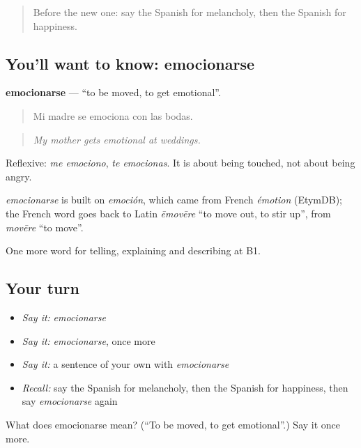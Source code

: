\begin{quote}
Before the new one: say the Spanish for melancholy, then the Spanish for happiness.
\end{quote}

\subsection*{You'll want to know: emocionarse}
\textbf{emocionarse} — \textquotedblleft{}to be moved, to get emotional\textquotedblright{}.

\begin{quote}
Mi madre se emociona con las bodas.
\end{quote}

\begin{quote}
\emph{My mother gets emotional at weddings.}
\end{quote}

Reflexive: \emph{me emociono}, \emph{te emocionas}. It is about being touched, not about being angry.

\begin{cousinweb}
\emph{emocionarse} is built on \emph{emoción}, which came from French \emph{émotion} (EtymDB); the French word goes back to Latin \emph{ēmovēre} \textquotedblleft{}to move out, to stir up\textquotedblright{}, from \emph{movēre} \textquotedblleft{}to move\textquotedblright{}.
\end{cousinweb}

\begin{grammarlens}[title={What you've built}]
One more word for telling, explaining and describing at B1.
\end{grammarlens}

\subsection*{Your turn}
\begin{itemize}
\raggedright
  \item \emph{Say it:} \emph{emocionarse}
  \item \emph{Say it:} \emph{emocionarse}, once more
  \item \emph{Say it:} a sentence of your own with \emph{emocionarse}
  \item \emph{Recall:} say the Spanish for melancholy, then the Spanish for happiness, then say \emph{emocionarse} again
\end{itemize}

\begin{tcolorbox}[breakable,colback=teal!4,colframe=teal!35!black,title={Before you move on}]
What does emocionarse mean? (\textquotedblleft{}To be moved, to get emotional\textquotedblright{}.) Say it once more.
\end{tcolorbox}
